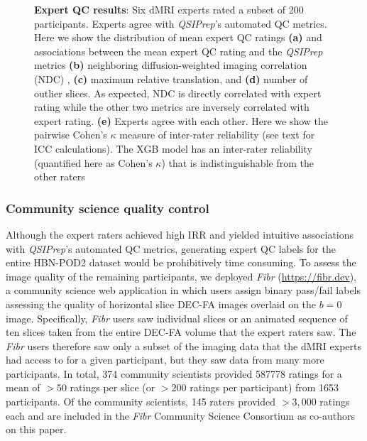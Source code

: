 \documentclass[9pt,lineno]{elife}
\begin{document}
\begin{figure}[tbp]
\begin{fullwidth}
\begin{subfigure}{.4\linewidth}
    \end{subfigure}
    \caption{%
        {\bf Expert QC results}:
        Six dMRI experts rated a subset of \num{200} participants.  Experts agree
        with \emph{QSIPrep}'s automated QC metrics.  Here we show the
        distribution of mean expert QC ratings \textbf{(a)} and associations
        between the mean expert QC rating and the \emph{QSIPrep} metrics
        \textbf{(b)} neighboring diffusion-weighted imaging correlation (NDC)
        \citep{yeh2019-kb}, \textbf{(c)} maximum relative translation, and
        \textbf{(d)} number of outlier slices. As expected, NDC is directly
        correlated with expert rating while the other two metrics are inversely
        correlated with expert rating.
        \textbf{(e)} Experts agree with each other. Here we show the pairwise
        Cohen's $\kappa$ measure of inter-rater reliability (see text for ICC
        calculations). The XGB model has an inter-rater reliability (quantified
        here as Cohen's $\kappa$) that is indistinguishable from the other
        raters
    }
    \label{fig:expert-qc}
\end{fullwidth}
\end{figure}

\subsubsection{Community science quality control}

Although the expert raters achieved high IRR and yielded intuitive associations
with \emph{QSIPrep}'s automated QC metrics, generating expert QC labels for the
entire HBN-POD2 dataset would be prohibitively time consuming. To assess the
image quality of the remaining participants, we deployed \emph{Fibr}
(\url{https://fibr.dev}), a community science web application in which users
assign binary pass/fail labels assessing the quality of horizontal slice DEC-FA
images overlaid on the $b=0$ image. Specifically, \emph{Fibr} users saw individual
slices or an animated sequence of ten slices taken from the entire DEC-FA volume
that the expert raters saw. The \emph{Fibr} users therefore saw only a subset of
the imaging data that the dMRI experts had access to for a given participant, but they
saw data from many more participants. In total, \num{374} community scientists provided
\num{587778} ratings for a mean of $>50$ ratings per slice (or $>200$ ratings
per participant) from \num{1653} participants. Of the community scientists, \num{145}
raters provided $>3,000$ ratings each and are included in the \emph{Fibr} Community
Science Consortium as co-authors on this paper.
\end{document}
